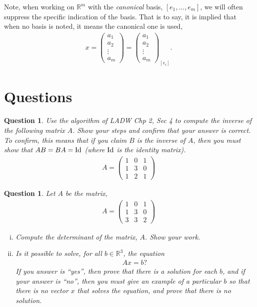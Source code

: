 \documentclass[12pt]{article}
\newtheorem{question}[thm]{Question}
\def\real{{\mathbb R}}
\def\Id{\textnormal{Id}}
\newcommand{\ColVecFour}[4]{\begin{pmatrix} #1\\ #2\\#3 \\ #4\end{pmatrix}}
\newcommand{\MatrixThreeThree}[9]{\begin{pmatrix} #1 &#2 &#3\\ #4 &#5 &#6\\ #7 &#8 &#9 \end{pmatrix}}
\begin{document}
Note, when working on $\real^m$ with the \emph{canonical} basis, $[e_1,\dots, e_m]$, we will often suppress the specific indication of the basis.  That is to say, it is implied that when no basis is noted, it means the canonical one is used, 
\begin{align*}
	x=\ColVecFour{a_1}{a_2}{\vdots}{a_m} = \ColVecFour{a_1}{a_2}{\vdots}{a_m}_{[e_i]}.
\end{align*}







\section{Questions}


\begin{question}\label{que:MatrixInverseShowSteps}
	\normalfont
	Use the algorithm of LADW Chp 2, Sec 4 to compute the inverse of the following matrix $A$.  Show your steps and confirm that your answer is correct.  To confirm, this means that if you claim $B$ is the inverse of $A$, then you must show that $AB=BA=\Id$ (where $\Id$ is the identity matrix).
	\begin{align*}
		A = 
		\MatrixThreeThree{1}{0}{1}{1}{3}{0}{1}{2}{1}
	\end{align*}
 
 
\end{question}





\begin{question}
	\normalfont
	
	Let $A$ be the matrix,
	\begin{align*}
		A = 
		\MatrixThreeThree{1}{0}{1}{1}{3}{0}{3}{3}{2}
	\end{align*}
	
	\begin{enumerate}[(i)]
		\item Compute the determinant of the matrix, $A$. Show your work. 
		
		\item Is it possible to solve, for all $b\in\real^3$, the equation
		\begin{align*}
			Ax=b?
		\end{align*}
		If you answer is ``yes'', then prove that there is a solution for each $b$, and if your answer is ``no'', then you must give an example of a particular $b$ so that there is no vector $x$ that solves the equation, and prove that there is no solution. 
	\end{enumerate}
	
	
	
 
\end{question}
\end{document}
